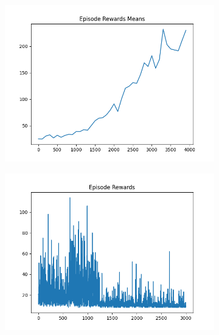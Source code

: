 \begin{figure}[H]
    \centering
    \begin{subfigure}{.47\linewidth}
        \centering
        \includegraphics[width=\textwidth]{pole/2024-06-13_23-49-30_dqn_cartpole_episode_rewards_means.png}
    \end{subfigure}
    \begin{subfigure}{.47\linewidth}
        \centering
        \includegraphics[width=\textwidth]{pole/2024-06-13_18-56-41_dqn_cartpole_episode_rewards.png}
    \end{subfigure}
    \begin{subfigure}{.47\linewidth}
        \centering

\end{subfigure}
\end{figure}
